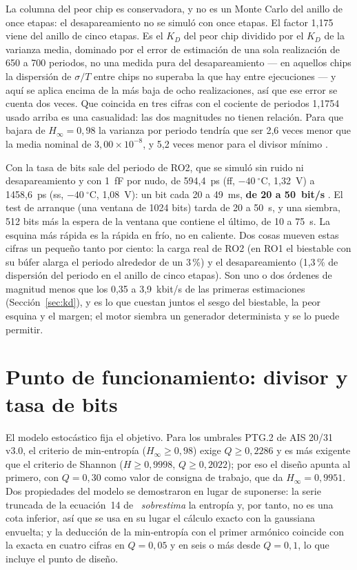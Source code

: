 La columna del peor chip es conservadora, y no es un Monte Carlo del
anillo de once etapas: el desapareamiento no se simuló con once etapas.
El factor 1,175 viene del anillo de cinco etapas. Es el $K_D$ del peor
chip dividido por el $K_D$ de la varianza media,
dominado por el error de estimación de una sola realización de
650 a 700 periodos, no una medida pura del desapareamiento --- en
aquellos chips la dispersión de $\sigma/T$ entre chips no superaba la que
hay entre ejecuciones --- y aquí se aplica encima de la más baja de ocho
realizaciones, así que ese error se cuenta dos veces. Que coincida en
tres cifras con el cociente de periodos 1,1754 usado arriba es una
casualidad: las dos magnitudes no tienen relación. Para que 
bajara de $H_\infty = 0{,}98$ la varianza por periodo tendría que ser 2,6
veces menor que la media nominal de $3{,}00\times10^{-8}$, y 5,2 veces
menor para el divisor mínimo  \est{}.

Con  la tasa de bits sale del periodo de RO2, que se simuló sin
ruido ni desapareamiento y con 1~fF por nudo, de 594,4~ps (ff,
$-40~^\circ$C, 1,32~V) a 1458,6~ps (ss, $-40~^\circ$C, 1,08~V): un bit
cada 20 a 49~ms, \textbf{de 20 a 50~bit/s} \est{}. El test de arranque
(una ventana de 1024 bits) tarda de 20 a 50~s, y una siembra, 512 bits
más la espera de la ventana que contiene el último, de 10 a 75~s. La
esquina más rápida es la rápida en frío, no en caliente. Dos cosas mueven
estas cifras un pequeño tanto por ciento: la carga real de RO2 (en RO1 el
biestable con su búfer alarga el periodo alrededor de un 3\,\%) y el
desapareamiento (1,3\,\% de dispersión del periodo en el anillo de cinco
etapas). Son uno o dos órdenes de magnitud menos que los 0,35 a
3,9~kbit/s de las primeras estimaciones (Sección~\ref{sec:kd}), y es lo
que cuestan juntos el sesgo del biestable, la peor
esquina y el margen; el motor siembra un generador determinista y se lo
puede permitir.

\section{Punto de funcionamiento: divisor y tasa de bits}
\label{sec:opoint}

El modelo estocástico fija el objetivo. Para los umbrales PTG.2 de AIS
20/31 v3.0, el criterio de min-entropía ($H_\infty \ge 0{,}98$) exige
$Q \ge 0{,}2286$ y es más exigente que el criterio de Shannon
($H \ge 0{,}9998$, $Q \ge 0{,}2022$); por eso el diseño apunta al primero,
con $Q = 0{,}30$ como valor de consigna de trabajo, que da
$H_\infty = 0{,}9951$. Dos propiedades del modelo se demostraron en lugar
de suponerse: la serie truncada de la ecuación~14
de~\cite{baudet_2011_security} \emph{sobrestima} la entropía y, por
tanto, no es una cota inferior, así que se usa en su lugar el cálculo
exacto con la gaussiana envuelta; y la deducción de la min-entropía con el
primer armónico coincide con la exacta en cuatro cifras en $Q = 0{,}05$
y en seis o más desde $Q = 0{,}1$, lo que incluye el punto de diseño.

